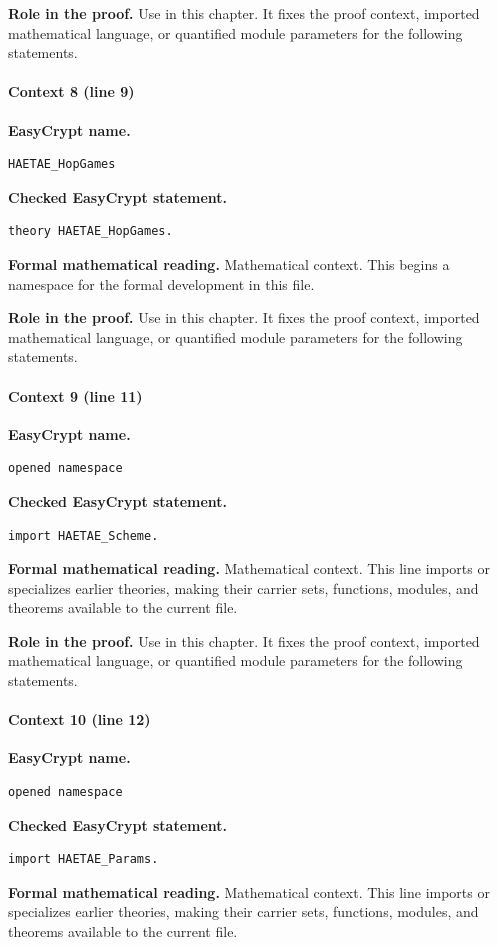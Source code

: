 \noindent\textbf{Role in the proof.}
Use in this chapter. It fixes the proof context, imported mathematical language, or quantified module parameters for the following statements.

\paragraph{Context 8 (line 9)}
\noindent\textbf{EasyCrypt name.}
\begin{lstlisting}[language=EasyCrypt,basicstyle=\ttfamily\scriptsize]
HAETAE_HopGames
\end{lstlisting}
\noindent\textbf{Checked EasyCrypt statement.}
\begin{lstlisting}[language=EasyCrypt,basicstyle=\ttfamily\scriptsize]
theory HAETAE_HopGames.
\end{lstlisting}
\noindent\textbf{Formal mathematical reading.}
Mathematical context. This begins a namespace for the formal development in this file.

\noindent\textbf{Role in the proof.}
Use in this chapter. It fixes the proof context, imported mathematical language, or quantified module parameters for the following statements.

\paragraph{Context 9 (line 11)}
\noindent\textbf{EasyCrypt name.}
\begin{lstlisting}[language=EasyCrypt,basicstyle=\ttfamily\scriptsize]
opened namespace
\end{lstlisting}
\noindent\textbf{Checked EasyCrypt statement.}
\begin{lstlisting}[language=EasyCrypt,basicstyle=\ttfamily\scriptsize]
import HAETAE_Scheme.
\end{lstlisting}
\noindent\textbf{Formal mathematical reading.}
Mathematical context. This line imports or specializes earlier theories, making their carrier sets, functions, modules, and theorems available to the current file.

\noindent\textbf{Role in the proof.}
Use in this chapter. It fixes the proof context, imported mathematical language, or quantified module parameters for the following statements.

\paragraph{Context 10 (line 12)}
\noindent\textbf{EasyCrypt name.}
\begin{lstlisting}[language=EasyCrypt,basicstyle=\ttfamily\scriptsize]
opened namespace
\end{lstlisting}
\noindent\textbf{Checked EasyCrypt statement.}
\begin{lstlisting}[language=EasyCrypt,basicstyle=\ttfamily\scriptsize]
import HAETAE_Params.
\end{lstlisting}
\noindent\textbf{Formal mathematical reading.}
Mathematical context. This line imports or specializes earlier theories, making their carrier sets, functions, modules, and theorems available to the current file.

